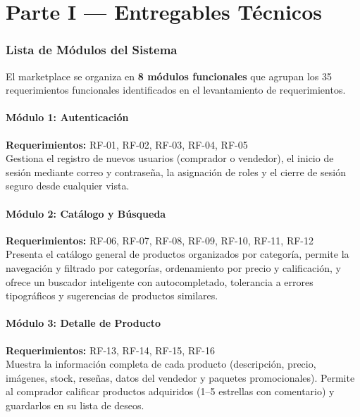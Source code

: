 \documentclass[12pt,a4paper]{article}
\begin{document}
\part*{Parte I --- Entregables Técnicos}

\section{Lista de Módulos del Sistema}

El marketplace se organiza en \textbf{8 módulos funcionales} que agrupan los 35 requerimientos funcionales identificados en el levantamiento de requerimientos.

\subsection{Módulo 1: Autenticación}
\textbf{Requerimientos:} RF-01, RF-02, RF-03, RF-04, RF-05\\
Gestiona el registro de nuevos usuarios (comprador o vendedor), el inicio de sesión mediante correo y contraseña, la asignación de roles y el cierre de sesión seguro desde cualquier vista.

\subsection{Módulo 2: Catálogo y Búsqueda}
\textbf{Requerimientos:} RF-06, RF-07, RF-08, RF-09, RF-10, RF-11, RF-12\\
Presenta el catálogo general de productos organizados por categoría, permite la navegación y filtrado por categorías, ordenamiento por precio y calificación, y ofrece un buscador inteligente con autocompletado, tolerancia a errores tipográficos y sugerencias de productos similares.

\subsection{Módulo 3: Detalle de Producto}
\textbf{Requerimientos:} RF-13, RF-14, RF-15, RF-16\\
Muestra la información completa de cada producto (descripción, precio, imágenes, stock, reseñas, datos del vendedor y paquetes promocionales). Permite al comprador calificar productos adquiridos (1--5 estrellas con comentario) y guardarlos en su lista de deseos.
\end{document}
